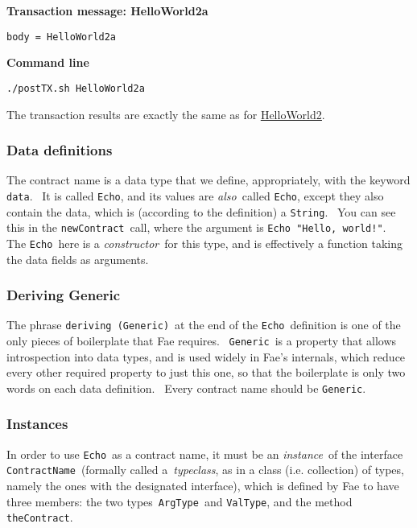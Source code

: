 \documentclass[11pt]{article}
\newcommand{\codeblock}[1]{\begin{mdframed}[
    backgroundcolor=header-color,
    linecolor=header-color,
    innertopmargin=10pt,
    ]{\texttt{#1}}\end{mdframed}}
\DeclareRobustCommand{\fuline}[1]{\texorpdfstring{\uline{#1}}{#1}}
\begin{document}
\textbf{Transaction message: HelloWorld2a}

\codeblock{body = HelloWorld2a}

\textbf{Command line}

\codeblock{.\slash{}postTX.sh HelloWorld2a}

The transaction results are exactly the same as for \href{https://consensys.quip.com/IHP2AzL922EJ/Tutorial-1-Transactions-and-contracts\%23PfaACAL7oXx}{\fuline{HelloWorld2}}.

\subsubsection{Data definitions}
\vspace{5.5pt}

The contract name is a data type that we define, appropriately, with the keyword \texttt{data}.  It is called \texttt{Echo}, and its values are \textit{also} called \texttt{Echo}, except they also contain the data, which is (according to the definition) a \texttt{String}.  You can see this in the \texttt{newContract} call, where the argument is \texttt{Echo "Hello, world!"}.  The \texttt{Echo} here is a \textit{constructor} for this type, and is effectively a function taking the data fields as arguments.

\subsubsection{Deriving Generic}
\vspace{5.5pt}

The phrase \texttt{deriving (Generic)} at the end of the \texttt{Echo} definition is one of the only pieces of boilerplate that Fae requires.  \texttt{Generic} is a property that allows introspection into data types, and is used widely in Fae's internals, which reduce every other required property to just this one, so that the boilerplate is only two words on each data definition.  Every contract name should be \texttt{Generic}.

\subsubsection{Instances}
\vspace{5.5pt}

In order to use \texttt{Echo} as a contract name, it must be an \textit{instance} of the interface \texttt{ContractName} (formally called a \textit{typeclass}, as in a class (i.e. collection) of types, namely the ones with the designated interface), which is defined by Fae to have three members: the two types \texttt{ArgType} and \texttt{ValType}, and the method \texttt{theContract}.
\end{document}
